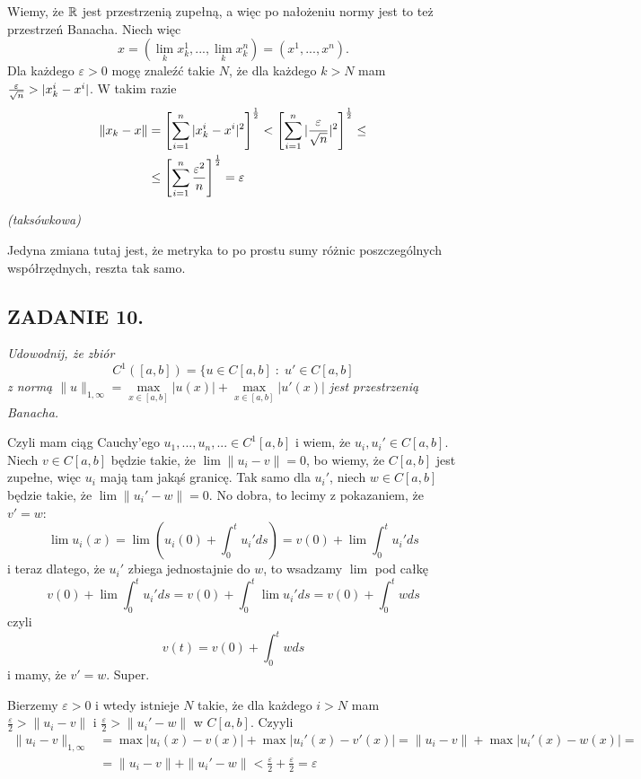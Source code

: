 \documentclass{article}
\begin{document}
Wiemy, że $\mathbb{R}$ jest przestrzenią zupełną, a więc po nałożeniu normy jest to też przestrzeń Banacha. Niech więc 
$$x=(\lim_k x_k^1,...,\lim_kx_k^n)=(x^1,...,x^n).$$
Dla każdego $\varepsilon>0$ mogę znaleźć takie $N$, że dla każdego $k>N$ mam ${\varepsilon\over \sqrt{n}}>|x_k^i-x^i|$. W takim razie
\begin{align*}
    \|x_k-x\|&=\left[\sum\limits_{i=1}^n|x_k^i-x^i|^2\right]^\frac12<\left[\sum\limits_{i=1}^n|{\varepsilon\over \sqrt{n}}|^2\right]^\frac12\leq\\
    &\leq \left[\sum\limits_{i=1}^n{\varepsilon^2\over n}\right]^\frac12=\varepsilon
\end{align*}

\emph{\color{purple}(taksówkowa)}

Jedyna zmiana tutaj jest, że metryka to po prostu sumy różnic poszczególnych współrzędnych, reszta tak samo.

\subsection*{ZADANIE 10.}
{\color{purple}\emph{Udowodnij, że zbiór}
$$C^1([a, b])=\{u\in C[a, b]\;:\;u'\in C[a, b]$$
\emph{z normą $\|u\|_{1,\infty}=\max\limits_{x\in [a, b]}|u(x)|+\max\limits_{x\in[a,b]}|u'(x)|$ jest przestrzenią Banacha. }}


Czyli mam ciąg Cauchy'ego $u_1,...,u_n,...\in C^1[a, b]$ i wiem, że $u_i,u_i'\in C[a, b]$. Niech $v\in C[a,b]$ będzie takie, że $\lim\|u_i-v\|=0$, bo wiemy, że $C[a,b]$ jest zupełne, więc $u_i$ mają tam jakąś granicę. Tak samo dla $u_i'$, niech $w\in C[a, b]$ będzie takie, że $\lim\|u_i'-w\|=0$. No dobra, to lecimy z pokazaniem, że $v'=w$:
$$\lim u_i(x)=\lim \left(u_i(0)+\int_0^tu_i'ds\right)=v(0)+\lim\int_0^tu_i'ds$$
i teraz dlatego, że $u_i'$ zbiega jednostajnie do $w$, to wsadzamy $\lim$ pod całkę
$$v(0)+\lim\int_0^tu_i'ds=v(0)+\int_0^t\lim u_i'ds=v(0)+\int_0^twds$$
czyli
$$v(t)=v(0)+\int_0^twds$$
i mamy, że $v'=w$. Super.

Bierzemy $\varepsilon>0$ i wtedy istnieje $N$ takie, że dla każdego $i>N$ mam $\frac\varepsilon2>\|u_i-v\|$ i $\frac\varepsilon2>\|u_i'-w\|$ w $C[a,b]$. Czyyli
\begin{align*}
    \|u_i-v\|_{1,\infty}&=\max|u_i(x)-v(x)|+\max|u_i'(x)-v'(x)|=\|u_i-v\|+\max|u_i'(x)-w(x)|=\\
    &=\|u_i-v\|+\|u_i'-w\|<\frac\varepsilon2+\frac\varepsilon2=\varepsilon
\end{align*}
\end{document}
